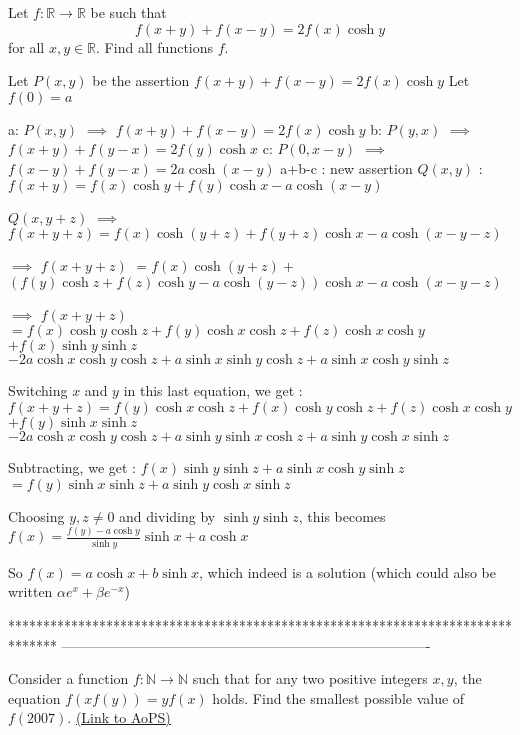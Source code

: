 \begin{solution}
	\begin{tcolorbox}Let $ f:\mathbb{R}\rightarrow \mathbb{R} $ be such that \[f(x+y)+f(x-y)=2f(x)\cosh y\]
for all $ x,y\in \mathbb{R} $.
Find all functions $ f $.\end{tcolorbox}
Let $P(x,y)$ be the assertion $f(x+y)+f(x-y)=2f(x)\cosh y$
Let $f(0)=a$

a: $P(x,y)$ $\implies$ $f(x+y)+f(x-y)=2f(x)\cosh y$
b: $P(y,x)$ $\implies$ $f(x+y)+f(y-x)=2f(y)\cosh x$
c: $P(0,x-y)$ $\implies$ $f(x-y)+f(y-x)=2a\cosh (x-y)$
a+b-c : new assertion $Q(x,y)$ : $f(x+y)=f(x)\cosh y+f(y)\cosh x-a\cosh(x-y)$

$Q(x,y+z)$ $\implies$ $f(x+y+z)=f(x)\cosh (y+z)+f(y+z)\cosh x-a\cosh(x-y-z)$

$\implies$ $f(x+y+z)$ $=f(x)\cosh (y+z)+$ $(f(y)\cosh z+f(z)\cosh y-a\cosh(y-z))\cosh x-a\cosh(x-y-z)$

$\implies$ $f(x+y+z)$ $=f(x)\cosh y\cosh z+f(y)\cosh x\cosh z+f(z)\cosh x\cosh y$ $+f(x)\sinh y\sinh z$ $-2a\cosh x\cosh y\cosh z +a\sinh x\sinh y\cosh z + a\sinh x\cosh y\sinh z$

Switching $x$ and $y$ in this last equation, we get :
$f(x+y+z)=f(y)\cosh x\cosh z+f(x)\cosh y\cosh z+f(z)\cosh x\cosh y$ $+f(y)\sinh x\sinh z$ $-2a\cosh x\cosh y\cosh z +a\sinh y\sinh x\cosh z + a\sinh y\cosh x\sinh z$

Subtracting, we get :
$f(x)\sinh y\sinh z+ a\sinh x\cosh y\sinh z$ $=f(y)\sinh x\sinh z+ a\sinh y\cosh x\sinh z$

Choosing $y,z\ne 0$ and dividing by $\sinh y\sinh z$, this becomes $f(x)=\frac{f(y)-a\cosh y}{\sinh y}\sinh x+ a\cosh x$

So $\boxed{f(x)=a\cosh x + b\sinh x}$, which indeed is a solution (which could also be written $\alpha e^x+\beta e^{-x}$)
\end{solution}
*******************************************************************************
-------------------------------------------------------------------------------

\begin{problem}
	Consider a function $f:\mathbb N\rightarrow \mathbb N$ such that for any two positive integers $x,y$, the equation $f(xf(y))=yf(x)$ holds. Find the smallest possible value of $f(2007)$.
	\flushright \href{https://artofproblemsolving.com/community/c6h467460}{(Link to AoPS)}
\end{problem}



